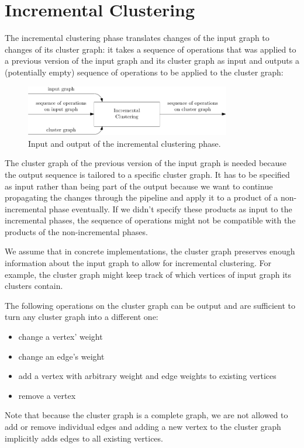 \section{Incremental Clustering}
\label{sect:incremental-clustering}

The incremental clustering phase translates changes of the input graph to changes of its cluster graph: it takes a sequence of operations that was applied to a previous version of the input graph and its cluster graph as input and outputs a (potentially empty) sequence of operations to be applied to the cluster graph:

\begin{figure}[H]
	\centering\includegraphics[width=0.8\textwidth]{Resources/DynamicPipeline-IncrementalClustering.pdf}
	\caption{Input and output of the incremental clustering phase.}
	\label{fig:dynamic-pipeline-incremental-transformation}
\end{figure}

The cluster graph of the previous version of the input graph is needed because the output sequence is tailored to a specific cluster graph. It has to be specified as input rather than being part of the output because we want to continue propagating the changes through the pipeline and apply it to a product of a non-incremental phase eventually. If we didn't specify these products as input to the incremental phases, the sequence of operations might not be compatible with the products of the non-incremental phases.

We assume that in concrete implementations, the cluster graph preserves enough information about the input graph to allow for incremental clustering. For example, the cluster graph might keep track of which vertices of input graph its clusters contain.

The following operations on the cluster graph can be output and are sufficient to turn any cluster graph into a different one:
%
\begin{itemize}
	\setlength\itemsep{-0.5em}
	\item change a vertex' weight
	\item change an edge's weight
	\item add a vertex with arbitrary weight and edge weights to existing vertices
	\item remove a vertex
\end{itemize}
%
Note that because the cluster graph is a complete graph, we are not allowed to add or remove individual edges and adding a new vertex to the cluster graph implicitly adds edges to all existing vertices.
